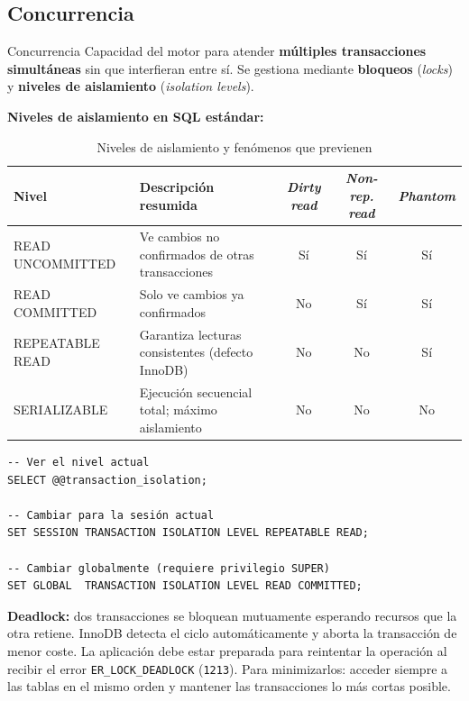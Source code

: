 \subsection{Concurrencia}

\begin{definicion}{Concurrencia}
  Capacidad del motor para atender \textbf{múltiples transacciones
  simultáneas} sin que interfieran entre sí. Se gestiona mediante
  \textbf{bloqueos} (\textit{locks}) y \textbf{niveles de aislamiento}
  (\textit{isolation levels}).
\end{definicion}

\textbf{Niveles de aislamiento en SQL estándar:}

\begin{table}[H]
  \centering
  \caption{Niveles de aislamiento y fenómenos que previenen}
  \renewcommand{\arraystretch}{1.3}
  \begin{tabularx}{\textwidth}{l X c c c}
    \toprule
    \textbf{Nivel}      & \textbf{Descripción resumida}
      & \textbf{\textit{Dirty read}}
      & \textbf{\textit{Non-rep. read}}
      & \textbf{\textit{Phantom}} \\
    \midrule
    READ UNCOMMITTED & Ve cambios no confirmados de otras transacciones   & Sí & Sí & Sí \\
    READ COMMITTED   & Solo ve cambios ya confirmados                     & No & Sí & Sí \\
    REPEATABLE READ  & Garantiza lecturas consistentes (defecto InnoDB)   & No & No & Sí \\
    SERIALIZABLE     & Ejecución secuencial total; máximo aislamiento      & No & No & No \\
    \bottomrule
  \end{tabularx}
\end{table}

\begin{lstlisting}[style=sql, caption={Configurar y consultar el nivel de aislamiento}]
-- Ver el nivel actual
SELECT @@transaction_isolation;

-- Cambiar para la sesión actual
SET SESSION TRANSACTION ISOLATION LEVEL REPEATABLE READ;

-- Cambiar globalmente (requiere privilegio SUPER)
SET GLOBAL  TRANSACTION ISOLATION LEVEL READ COMMITTED;
\end{lstlisting}

\begin{nota}
  \textbf{Deadlock:} dos transacciones se bloquean mutuamente esperando
  recursos que la otra retiene. InnoDB detecta el ciclo automáticamente y
  aborta la transacción de menor coste. La aplicación debe estar preparada
  para reintentar la operación al recibir el error \texttt{ER\_LOCK\_DEADLOCK}
  (\texttt{1213}). Para minimizarlos: acceder siempre a las tablas en el
  mismo orden y mantener las transacciones lo más cortas posible.
\end{nota}

